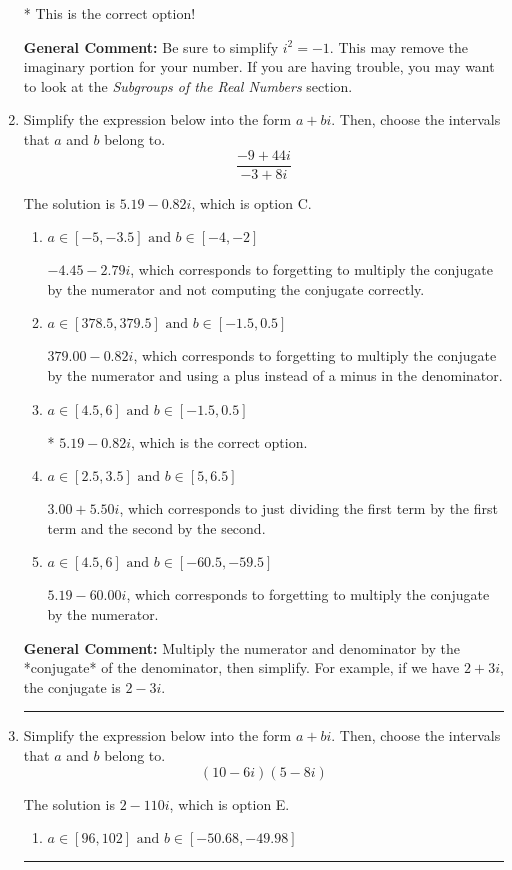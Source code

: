 \documentclass{extbook}[14pt]
\newcommand{\litem}[1]{\item #1

\rule{\textwidth}{0.4pt}}
\begin{document}
\begin{enumerate}
{\begin{enumerate}[label=\Alph*.]
* This is the correct option!
\end{enumerate}

\textbf{General Comment:} Be sure to simplify $i^2 = -1$. This may remove the imaginary portion for your number. If you are having trouble, you may want to look at the \textit{Subgroups of the Real Numbers} section.
}
\litem{
Simplify the expression below into the form $a+bi$. Then, choose the intervals that $a$ and $b$ belong to.
\[ \frac{-9 + 44 i}{-3 + 8 i} \]

The solution is \( 5.19  - 0.82 i \), which is option C.\begin{enumerate}[label=\Alph*.]
\item \( a \in [-5, -3.5] \text{ and } b \in [-4, -2] \)

 $-4.45  - 2.79 i$, which corresponds to forgetting to multiply the conjugate by the numerator and not computing the conjugate correctly.
\item \( a \in [378.5, 379.5] \text{ and } b \in [-1.5, 0.5] \)

 $379.00  - 0.82 i$, which corresponds to forgetting to multiply the conjugate by the numerator and using a plus instead of a minus in the denominator.
\item \( a \in [4.5, 6] \text{ and } b \in [-1.5, 0.5] \)

* $5.19  - 0.82 i$, which is the correct option.
\item \( a \in [2.5, 3.5] \text{ and } b \in [5, 6.5] \)

 $3.00  + 5.50 i$, which corresponds to just dividing the first term by the first term and the second by the second.
\item \( a \in [4.5, 6] \text{ and } b \in [-60.5, -59.5] \)

 $5.19  - 60.00 i$, which corresponds to forgetting to multiply the conjugate by the numerator.
\end{enumerate}

\textbf{General Comment:} Multiply the numerator and denominator by the *conjugate* of the denominator, then simplify. For example, if we have $2+3i$, the conjugate is $2-3i$.
}
\litem{
Simplify the expression below into the form $a+bi$. Then, choose the intervals that $a$ and $b$ belong to.
\[ (10 - 6 i)(5 - 8 i) \]

The solution is \( 2 - 110 i \), which is option E.\begin{enumerate}[label=\Alph*.]
\item \( a \in [96, 102] \text{ and } b \in [-50.68, -49.98] \)


\end{enumerate}}
\end{enumerate}
\end{document}
